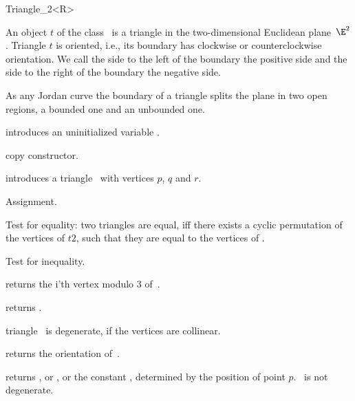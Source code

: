 \begin{ccRefClass} {Triangle_2<R>}

\ccDefinition  An object $t$ of the class \ccRefName\ is a triangle 
in the two-dimensional Euclidean plane~$\E^2$. 
Triangle  $t$  is oriented, i.e., its boundary has
clockwise or counterclockwise orientation. We call the side to the left
of the boundary the positive side and the side to the right of the
boundary the negative side.

As any Jordan curve the boundary of a triangle splits the plane in
two open regions, a bounded one and an unbounded one. 

\ccCreation
{}


\ccHidden {}
             {introduces an uninitialized variable \ccVar.}

\ccHidden {}
 	    {copy constructor.}


            {introduces a triangle \ccVar\ with vertices $p$,  $q$ and $r$.}


\ccOperations

\ccHidden {}
        {Assignment.}

       {Test for equality: two triangles are equal, iff there exists a 
        cyclic permutation of the vertices of $t2$, such that they are 
        equal to the vertices of \ccVar.}

       {Test for inequality.}

       {returns the i'th vertex modulo 3  of~\ccVar.}

       {returns .}

\ccPredicates

       {triangle \ccVar\ is degenerate, if the vertices are collinear.}

       {returns the orientation of~\ccVar.}

       {returns 
        , or
        , 
        or the constant
        ,
        determined by the position of point $p$.
        \ccPrecond \ccVar\ is not degenerate.}


\end{ccRefClass}
